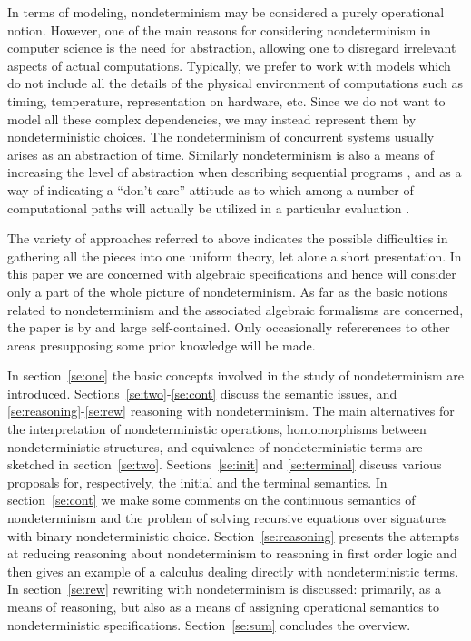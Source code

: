  In terms of modeling,
nondeterminism may be considered a purely operational notion. 
However, one of the main reasons for considering nondeterminism 
in computer science is the need for abstraction, allowing one to 
disregard irrelevant aspects of actual computations. Typically, we 
prefer to work with models which do not include all the details 
of the physical environment of computations such as timing, 
temperature, representation on hardware, etc. Since we do not want to 
model all these complex dependencies, we may instead represent them 
by nondeterministic choices. The nondeterminism 
of concurrent systems usually arises as an abstraction of time. 
Similarly nondeterminism is also a means of increasing the level of 
abstraction when describing sequential programs \cite{c:85, c:130}, and as a 
way of indicating a ``don't care''  attitude as to which among a 
number of computational 
paths will actually be utilized in a particular evaluation \cite{c:30}.

 The variety of approaches referred to above 
indicates the possible difficulties in gathering all the pieces into 
one uniform theory, let alone a short presentation. 
In this paper we are concerned with algebraic specifications and 
hence will consider only a part of the whole picture of 
nondeterminism. As far as the basic notions related to nondeterminism 
and the associated algebraic formalisms are concerned, the paper 
is by and large self-contained. Only occasionally refererences to 
other areas presupposing some prior knowledge will be made.

 In section~\ref{se:one} the basic concepts involved in the study of
nondeterminism are introduced. Sections~\ref{se:two}-\ref{se:cont}
discuss the semantic issues, and \ref{se:reasoning}-\ref{se:rew}
reasoning with nondeterminism. The main alternatives for the
interpretation of nondeterministic operations, homomorphisms between
nondeterministic structures, and equivalence of nondeterministic terms
are sketched in section~\ref{se:two}. Sections~\ref{se:init} and
\ref{se:terminal} discuss various proposals for, respectively, the
initial and the terminal semantics. In section~\ref{se:cont} we make some comments
on the continuous semantics of nondeterminism and the problem of
solving recursive equations over signatures with binary
nondeterministic choice.  Section~\ref{se:reasoning} presents the attempts at reducing
reasoning about nondeterminism to reasoning in first order logic and
then gives an example of a calculus dealing directly with
nondeterministic terms. In section~\ref{se:rew} rewriting with nondeterminism is
discussed: primarily, as a means of reasoning, but also as a means of
assigning operational semantics to nondeterministic specifications. Section~\ref{se:sum}
concludes the overview.

